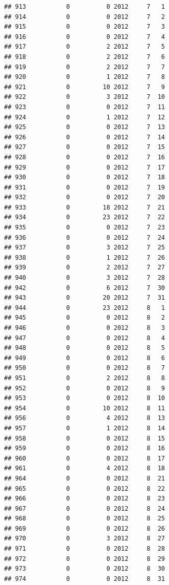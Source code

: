 \documentclass[
]{article}
\begin{document}
\begin{verbatim}
## 913           0          0 2012     7   1
## 914           0          0 2012     7   2
## 915           0          0 2012     7   3
## 916           0          0 2012     7   4
## 917           0          2 2012     7   5
## 918           0          2 2012     7   6
## 919           0          2 2012     7   7
## 920           0          1 2012     7   8
## 921           0         10 2012     7   9
## 922           0          3 2012     7  10
## 923           0          0 2012     7  11
## 924           0          1 2012     7  12
## 925           0          0 2012     7  13
## 926           0          0 2012     7  14
## 927           0          0 2012     7  15
## 928           0          0 2012     7  16
## 929           0          0 2012     7  17
## 930           0          0 2012     7  18
## 931           0          0 2012     7  19
## 932           0          0 2012     7  20
## 933           0         18 2012     7  21
## 934           0         23 2012     7  22
## 935           0          0 2012     7  23
## 936           0          0 2012     7  24
## 937           0          3 2012     7  25
## 938           0          1 2012     7  26
## 939           0          2 2012     7  27
## 940           0          3 2012     7  28
## 942           0          6 2012     7  30
## 943           0         20 2012     7  31
## 944           0         23 2012     8   1
## 945           0          0 2012     8   2
## 946           0          0 2012     8   3
## 947           0          0 2012     8   4
## 948           0          0 2012     8   5
## 949           0          0 2012     8   6
## 950           0          0 2012     8   7
## 951           0          2 2012     8   8
## 952           0          0 2012     8   9
## 953           0          0 2012     8  10
## 954           0         10 2012     8  11
## 956           0          4 2012     8  13
## 957           0          1 2012     8  14
## 958           0          0 2012     8  15
## 959           0          0 2012     8  16
## 960           0          0 2012     8  17
## 961           0          4 2012     8  18
## 964           0          0 2012     8  21
## 965           0          0 2012     8  22
## 966           0          0 2012     8  23
## 967           0          0 2012     8  24
## 968           0          0 2012     8  25
## 969           0          0 2012     8  26
## 970           0          3 2012     8  27
## 971           0          0 2012     8  28
## 972           0          0 2012     8  29
## 973           0          0 2012     8  30
## 974           0          0 2012     8  31

\end{verbatim}
\end{document}
